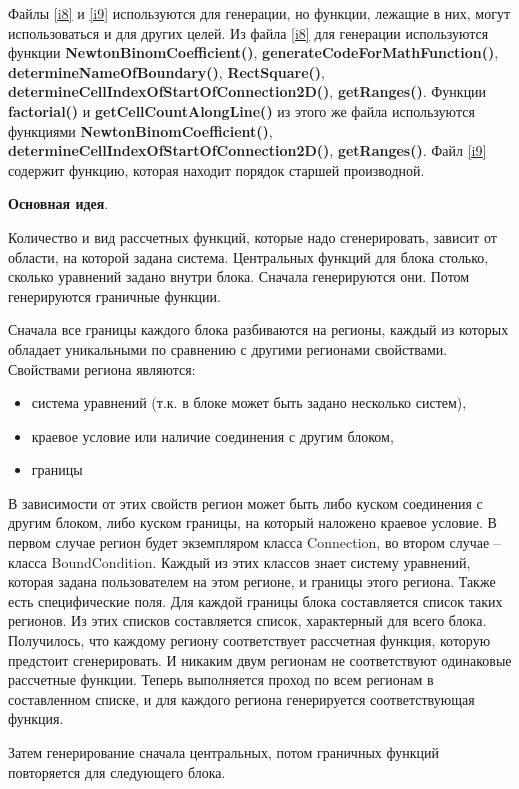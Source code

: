 \documentclass[a4paper]{article}
\begin{document}
Файлы \ref{i8} и \ref{i9} используются для генерации, но функции, лежащие в них, могут использоваться и для других целей. Из файла \ref{i8} для генерации используются функции {\bf NewtonBinomCoefficient()}, {\bf generateCodeForMathFunction()}, {\bf determineNameOfBoundary()}, {\bf RectSquare()}, {\bf determineCellIndexOfStartOfConnection2D()}, {\bf getRanges()}. Функции {\bf factorial()} и {\bf getCellCountAlongLine()} из этого же файла используются функциями {\bf NewtonBinomCoefficient()}, {\bf determineCellIndexOfStartOfConnection2D()}, {\bf getRanges()}. Файл \ref{i9} содержит функцию, которая находит порядок старшей про\-из\-вод\-ной.

\bigskip
{\bf Основная идея}.

Количество и вид рассчетных функций, которые надо сгенерировать, зависит от области, на которой задана система. Центральных функций для блока столько, сколько уравнений задано внутри блока. Сначала генерируются они. Потом ге\-не\-ри\-ру\-ют\-ся граничные функции.

Сначала все границы каждого блока разбиваются на регионы, каждый из которых обладает уникальными по сравнению с другими регионами свойствами. Свойствами региона являются:
\begin{itemize}
\item система уравнений (т.к. в блоке может быть задано несколько систем),
\item краевое условие или наличие соединения с другим блоком,
\item границы
\end{itemize}
В зависимости от этих свойств регион может быть либо куском соединения с другим блоком, либо куском границы, на который наложено краевое условие. В первом случае регион будет экземпляром класса Connection, во втором случае -- класса BoundCondition. Каждый из этих классов знает систему уравнений, которая задана пользователем на этом регионе, и границы этого региона. Также есть специфические поля. Для каждой границы блока составляется список таких регионов. Из этих списков составляется список, характерный для всего блока. Получилось, что каждому региону соответствует рассчетная функция, которую предстоит сгенерировать. И никаким двум регионам не соответствуют одинаковые рассчетные функции. Теперь выполняется проход по всем регионам в составленном списке, и для каждого региона генерируется соответствующая функция.

Затем генерирование сначала центральных, потом граничных функций по\-вто\-ря\-ет\-ся для следующего блока.
\end{document}
